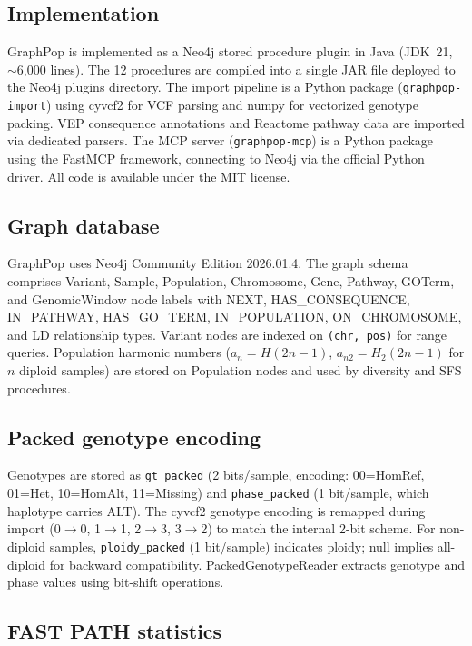 \subsection*{Implementation}

GraphPop is implemented as a Neo4j stored procedure plugin in Java (JDK~21, $\sim$6{,}000 lines). The 12 procedures are compiled into a single JAR file deployed to the Neo4j plugins directory. The import pipeline is a Python package (\texttt{graphpop-import}) using cyvcf2\cite{pedersen2017cyvcf2} for VCF parsing and numpy for vectorized genotype packing. VEP\cite{mclaren2016ensembl} consequence annotations and Reactome\cite{gillespie2022reactome} pathway data are imported via dedicated parsers. The MCP server (\texttt{graphpop-mcp}) is a Python package using the FastMCP framework, connecting to Neo4j via the official Python driver. All code is available under the MIT license.

\subsection*{Graph database}

GraphPop uses Neo4j Community Edition 2026.01.4. The graph schema comprises Variant, Sample, Population, Chromosome, Gene, Pathway, GOTerm, and GenomicWindow node labels with NEXT, HAS\_CONSEQUENCE, IN\_PATHWAY, HAS\_GO\_TERM, IN\_POPULATION, ON\_CHROMOSOME, and LD relationship types. Variant nodes are indexed on \texttt{(chr, pos)} for range queries. Population harmonic numbers ($a_n = H(2n-1)$, $a_{n2} = H_2(2n-1)$ for $n$ diploid samples) are stored on Population nodes and used by diversity and SFS procedures.

\subsection*{Packed genotype encoding}

Genotypes are stored as \texttt{gt\_packed} (2 bits/sample, encoding: 00=HomRef, 01=Het, 10=HomAlt, 11=Missing) and \texttt{phase\_packed} (1 bit/sample, which haplotype carries ALT). The cyvcf2 genotype encoding is remapped during import (0$\to$0, 1$\to$1, 2$\to$3, 3$\to$2) to match the internal 2-bit scheme. For non-diploid samples, \texttt{ploidy\_packed} (1 bit/sample) indicates ploidy; null implies all-diploid for backward compatibility. PackedGenotypeReader extracts genotype and phase values using bit-shift operations.

\subsection*{FAST PATH statistics}

